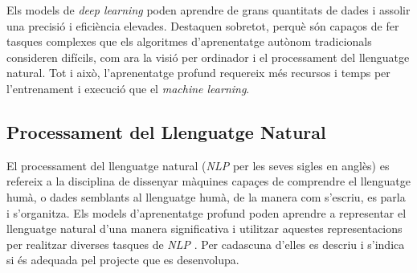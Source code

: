 Els models de \textit{deep learning} poden aprendre de grans quantitats de dades i assolir una precisió i eficiència elevades. Destaquen sobretot, perquè són capaços de fer tasques complexes que els algoritmes d'aprenentatge autònom tradicionals consideren difícils, com ara la visió per ordinador i el processament del llenguatge natural. Tot i això, l'aprenentatge profund requereix més recursos i temps per l'entrenament i execució que el \textit{machine learning}.

\subsection{Processament del Llenguatge Natural} \label{ssec:definicio_NLP}
El processament del llenguatge natural (\textit{NLP} per les seves sigles en anglès) es refereix a la disciplina de dissenyar màquines capaçes de comprendre el llenguatge humà, o dades semblants al llenguatge humà, de la manera com s'escriu, es parla i s'organitza. Els models d'aprenentatge profund poden aprendre a representar el llenguatge natural d'una manera significativa i utilitzar aquestes representacions per realitzar diverses tasques de \textit{NLP} \cite{Hugging-Face}. Per cadascuna d'elles es descriu i s'indica si és adequada pel projecte que es desenvolupa.

